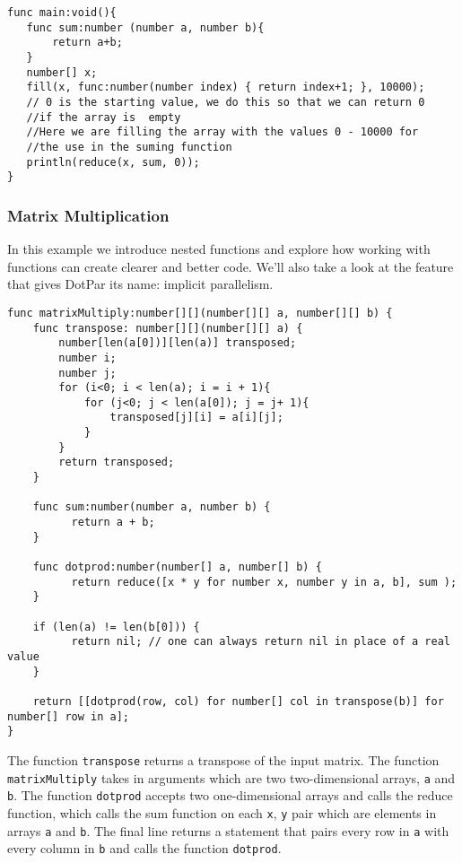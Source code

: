 \begin{verbatim}
func main:void(){
   func sum:number (number a, number b){
       return a+b;
   }
   number[] x;
   fill(x, func:number(number index) { return index+1; }, 10000);
   // 0 is the starting value, we do this so that we can return 0 
   //if the array is  empty
   //Here we are filling the array with the values 0 - 10000 for 
   //the use in the suming function
   println(reduce(x, sum, 0));
}
\end{verbatim}

\subsubsection{Matrix Multiplication}
In this example we introduce nested functions and explore how working with functions can create clearer and better code. We'll also take a look at the feature that gives DotPar its name: implicit parallelism.

\begin{verbatim}
func matrixMultiply:number[][](number[][] a, number[][] b) {
    func transpose: number[][](number[][] a) {
        number[len(a[0])][len(a)] transposed;
        number i;
        number j;
        for (i<0; i < len(a); i = i + 1){
            for (j<0; j < len(a[0]); j = j+ 1){
                transposed[j][i] = a[i][j];
            }
        }
        return transposed;
    }

    func sum:number(number a, number b) {
          return a + b;
    }
    
    func dotprod:number(number[] a, number[] b) {
          return reduce([x * y for number x, number y in a, b], sum );
    }
    
    if (len(a) != len(b[0])) {
          return nil; // one can always return nil in place of a real value
    }
    
    return [[dotprod(row, col) for number[] col in transpose(b)] for number[] row in a];
}
\end{verbatim}

The function \verb=transpose= returns a transpose of the input matrix. The
function \verb=matrixMultiply= takes in arguments which are two two-dimensional
arrays, \verb=a= and \verb=b=. The function \verb=dotprod= accepts two
one-dimensional arrays and calls the reduce function, which calls the sum
function on each \verb=x=, \verb=y= pair which are elements in arrays \verb=a=
and \verb=b=. The final line returns a statement that pairs every row in
\verb=a= with every column in \verb=b= and calls the function \verb=dotprod=.

